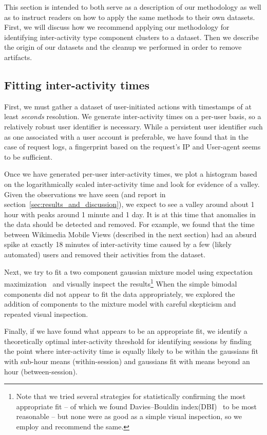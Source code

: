 This section is intended to both serve as a description of our methodology as well as to instruct readers on how to apply the same methods to their own datasets.  First, we will discuss how we recommend applying our methodology for identifying inter-activity type component clusters to a dataset.  Then we  describe the origin of our datasets and the cleanup we performed in order to remove artifacts.

\subsection{Fitting inter-activity times}
First, we must gather a dataset of user-initiated actions with timestamps of at least \emph{seconds} resolution.  We generate inter-activity times on a per-user basis, so a relatively robust user identifier is necessary.  While a persistent user identifier such as one associated with a user account is preferable, we have found that in the case of request logs, a fingerprint based on the request's IP and User-agent seems to be sufficient.

Once we have generated per-user inter-activity times, we plot a histogram based on the logarithmically scaled inter-activity time and look for evidence of a valley.  Given the observations we have seen (and report in section~\ref{sec:results_and_discussion}), we expect to see a valley around about 1 hour with peaks around 1 minute and 1 day.  It is at this time that anomalies in the data should be detected and removed.  For example, we found that the time between Wikimedia Mobile Views (described in the next section) had an absurd spike at exactly 18 minutes of inter-activity time caused by a few (likely automated) users and removed their activities from the dataset.

Next, we try to fit a two component gaussian mixture model using expectation maximization~\cite{benaglia2009mixtools} and visually inspect the results\footnote{Note that we tried several strategies for statistically confirming the most appropriate fit -- of which we found Davies--Bouldin index(DBI)~\cite{davies1979cluster} to be most reasonable -- but none were as good as a simple visual inspection, so we employ and recommend the same.}  When the simple bimodal components did not appear to fit the data appropriately, we explored the addition of components to the mixture model with careful skepticism and repeated visual inspection.

Finally, if we have found what appears to be an appropriate fit, we identify a theoretically optimal inter-activity threshold for identifying sessions by finding the point where inter-activity time is equally likely to be within the gaussians fit with sub-hour means (within-session) and gaussians fit with means beyond an hour (between-session).

